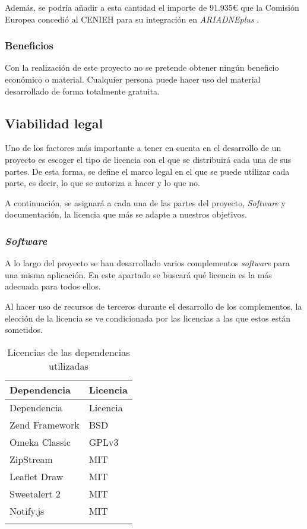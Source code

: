 Además, se podría añadir a esta cantidad el importe de 91.935\euro{} que la Comisión
Europea concedió al CENIEH para su integración en \emph{ARIADNEplus} \cite{cenieh:ariadne}.

\subsubsection{Beneficios}

Con la realización de este proyecto no se pretende obtener ningún
beneficio económico o material. Cualquier persona puede hacer uso del
material desarrollado de forma totalmente gratuita.

\subsection{Viabilidad legal}

Uno de los factores más importante a tener en cuenta en el desarrollo de
un proyecto es escoger el tipo de licencia con el que se distribuirá
cada una de sus partes. De esta forma, se define el marco legal en el
que se puede utilizar cada parte, es decir, lo que se autoriza a hacer y
lo que no.

A continuación, se asignará a cada una de las partes del proyecto,
\emph{Software} y documentación, la licencia que más se adapte a nuestros
objetivos.

\subsubsection{\emph{Software}}

A lo largo del proyecto se han desarrollado varios complementos
\emph{software} para una misma aplicación. En este apartado se buscará
qué licencia es la más adecuada para todos ellos.

Al hacer uso de recursos de terceros durante el desarrollo de los
complementos, la elección de la licencia se ve condicionada por las
licencias a las que estos están sometidos.

\begin{longtable}[]{@{}ll@{}}
\toprule
Dependencia & Licencia\tabularnewline
\midrule
\endfirsthead
\toprule
Dependencia & Licencia\tabularnewline
\midrule
\endhead
Zend Framework & BSD\tabularnewline
Omeka Classic & GPLv3\tabularnewline
ZipStream & MIT\tabularnewline
Leaflet Draw & MIT\tabularnewline
Sweetalert 2 & MIT\tabularnewline
Notify.js & MIT\tabularnewline
\bottomrule
\caption{Licencias de las dependencias utilizadas}\tabularnewline
\end{longtable}

